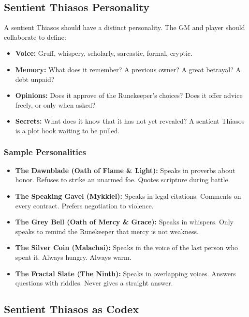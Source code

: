 \subsection{Sentient Thiasos Personality}

A sentient Thiasos should have a distinct personality. The GM and player should collaborate to define:

\begin{itemize}
\item \textbf{Voice:} Gruff, whispery, scholarly, sarcastic, formal, cryptic.
\item \textbf{Memory:} What does it remember? A previous owner? A great betrayal? A debt unpaid?
\item \textbf{Opinions:} Does it approve of the Runekeeper's choices? Does it offer advice freely, or only when asked?
\item \textbf{Secrets:} What does it know that it has not yet revealed? A sentient Thiasos is a plot hook waiting to be pulled.
\end{itemize}

\subsubsection{Sample Personalities}

\begin{itemize}
\item \textbf{The Dawnblade (Oath of Flame \& Light):} Speaks in proverbs about honor. Refuses to strike an unarmed foe. Quotes scripture during battle.
\item \textbf{The Speaking Gavel (Mykkiel):} Speaks in legal citations. Comments on every contract. Prefers negotiation to violence.
\item \textbf{The Grey Bell (Oath of Mercy \& Grace):} Speaks in whispers. Only speaks to remind the Runekeeper that mercy is not weakness.
\item \textbf{The Silver Coin (Malachai):} Speaks in the voice of the last person who spent it. Always hungry. Always warm.
\item \textbf{The Fractal Slate (The Ninth):} Speaks in overlapping voices. Answers questions with riddles. Never gives a straight answer.
\end{itemize}

\subsection{Sentient Thiasos as Codex}

